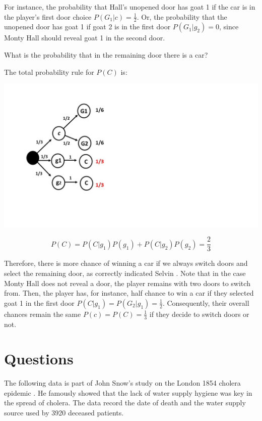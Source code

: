 \documentclass[
]{book}
\begin{document}
For instance, the probability that Hall's unopened door has goat 1 if the car is in the player's first door choice \(P(G_1|c)=\frac{1}{2}\). Or, the probability that the unopened door has goat 1 if goat 2 is in the first door \(P(G_1|g_2)=0\), since Monty Hall should reveal goat 1 in the second door.

What is the probability that in the remaining door there is a car?

The total probability rule for \(P(C)\) is:

\includegraphics{./figures/montyhall.jpg}

\[
P(C)=P(C|g_1)P(g_1)+P(C|g_2)P(g_2)=\frac{2}{3}
\]

Therefore, there is more chance of winning a car if we always switch doors and select the remaining door, as correctly indicated Selvin \citep{Selvin1975-SELAPI-2}. Note that in the case Monty Hall does not reveal a door, the player remains with two doors to switch from. Then, the player has, for instance, half chance to win a car if they selected goat 1 in the first door \(P(C|g_1)=P(G_2|g_1)=\frac{1}{2}\). Consequently, their overall chances remain the same \(P(c)=P(C)=\frac{1}{3}\) if they decide to switch doors or not.

\hypertarget{questions-2}{%
\section{Questions}\label{questions-2}}

The following data is part of John Snow's study on the London 1854 cholera epidemic \citep{snow1855mode}. He famously showed that the lack of water supply hygiene was key in the spread of cholera. The data record the date of death and the water supply source used by 3920 deceased patients.
\end{document}
